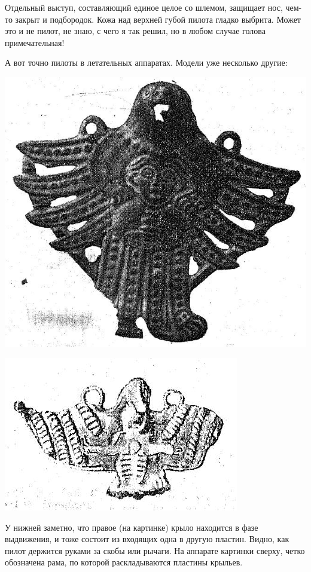 Отдельный выступ, составляющий единое целое со шлемом, защищает нос, чем-то закрыт и подбородок. Кожа над верхней губой пилота гладко выбрита. Может это и не пилот, не знаю, с чего я так решил, но в любом случае голова примечательная!

А вот точно пилоты в летательных аппаратах. Модели уже несколько другие:

\begin{center}
\includegraphics[width=0.85\linewidth]{chast-zmiy/ktotakiezmei/ural-bogi-08.jpg}
\end{center}

\begin{center}
\includegraphics[width=0.85\linewidth]{chast-zmiy/ktotakiezmei/ural-bogi-09.jpg}
\end{center}

У нижней заметно, что правое (на картинке) крыло находится в фазе выдвижения, и тоже состоит из входящих одна в другую пластин. Видно, как пилот держится руками за скобы или рычаги. На аппарате картинки сверху, четко обозначена рама, по которой раскладываются пластины крыльев.

